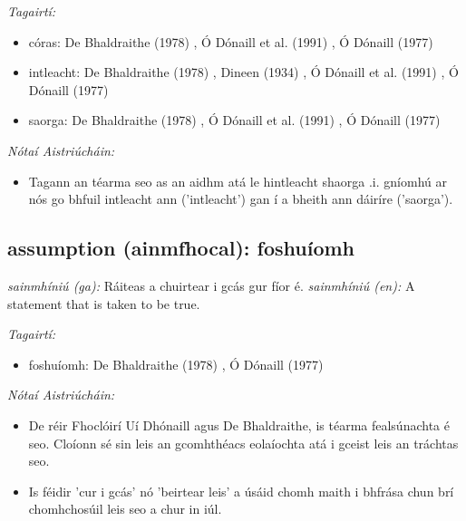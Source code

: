 \documentclass{article}
\begin{document}
 \noindent \textit{Tagairtí:}
\begin{itemize}
	\item córas: De Bhaldraithe (1978) \cite{de-bhaldraithe}, Ó Dónaill et al. (1991) \cite{focloir-beag}, Ó Dónaill (1977) \cite{odonaill}
	\item intleacht: De Bhaldraithe (1978) \cite{de-bhaldraithe}, Dineen (1934) \cite{dineen}, Ó Dónaill et al. (1991) \cite{focloir-beag}, Ó Dónaill (1977) \cite{odonaill}
	\item saorga: De Bhaldraithe (1978) \cite{de-bhaldraithe}, Ó Dónaill et al. (1991) \cite{focloir-beag}, Ó Dónaill (1977) \cite{odonaill}
\end{itemize}

 \noindent \textit{Nótaí Aistriúcháin:}
\begin{itemize}
	\item Tagann an téarma seo as an aidhm atá le hintleacht shaorga .i. gníomhú ar nós go bhfuil intleacht ann ('intleacht') gan í a bheith ann dáiríre ('saorga').
\end{itemize}


\subsection*{assumption (ainmfhocal): foshuíomh} 
 \noindent \textit{sainmhíniú (ga):} Ráiteas a chuirtear i gcás gur fíor é.
\newline\newline
 \noindent \textit{sainmhíniú (en):} A statement that is taken to be true.
\newline

 \noindent \textit{Tagairtí:}
\begin{itemize}
	\item foshuíomh: De Bhaldraithe (1978) \cite{de-bhaldraithe}, Ó Dónaill (1977) \cite{odonaill}
\end{itemize}

 \noindent \textit{Nótaí Aistriúcháin:}
\begin{itemize}
	\item De réir Fhoclóirí Uí Dhónaill agus De Bhaldraithe, is téarma fealsúnachta é seo. Cloíonn sé sin leis an gcomhthéacs eolaíochta atá i gceist leis an tráchtas seo.
	\item Is féidir 'cur i gcás' nó 'beirtear leis' a úsáid chomh maith i bhfrása chun brí chomhchosúil leis seo a chur in iúl.
\end{itemize}
\end{document}
